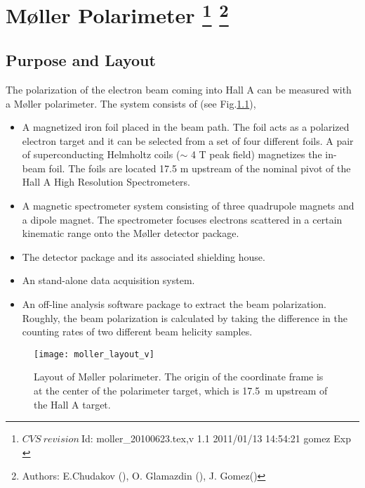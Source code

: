 \chapter[M{\o}ller Polarimeter]{M{\o}ller Polarimeter
\label{sec:moller}
\footnote{
  $CVS~revision~ $Id: moller_20100623.tex,v 1.1 2011/01/13 14:54:21 gomez Exp $ $
}
\footnote{Authors: E.Chudakov (), O. Glamazdin (), J. Gomez\hfill\break ()}
}
\section {Purpose and Layout}
\label{sec:moller_purpose}


The polarization of the electron beam coming into Hall A can be measured 
with a M{\o}ller 
polarimeter. 
The system consists of (see Fig.\ref{fig:moller_layout}),
\vspace{-\parskip}
\begin{itemize}
\item  A magnetized iron foil placed in the beam path. The foil acts as a polarized electron target and it can be selected
from a set of four different foils.
A pair of superconducting Helmholtz coils
($\sim$ 4 T peak field) magnetizes the in-beam foil. The foils are located 17.5 m upstream of the nominal pivot of the 
Hall A High Resolution Spectrometers.
\item A magnetic spectrometer system consisting of three quadrupole magnets and a dipole magnet.
The spectrometer focuses electrons scattered in a certain kinematic range
onto the M{\o}ller detector package. 
\item The detector package and its associated shielding house.
\item An stand-alone data acquisition system.
\item An off-line analysis software package to extract the beam polarization. Roughly, the beam polarization is calculated
by taking the difference in the counting rates of two different beam helicity samples.
\end{itemize}

 \begin{figure}[bht]
    \begin{center}
        \texttt{[image: moller\_layout\_v]}
    \end{center}
    \caption[M{\o}ller: layout]{
            Layout of M{\o}ller polarimeter. The origin of the 
            coordinate frame is at the center of the polarimeter
             target, which is 17.5~m upstream of the Hall A target.
            }
    \label{fig:moller_layout} 
 \end{figure}  


